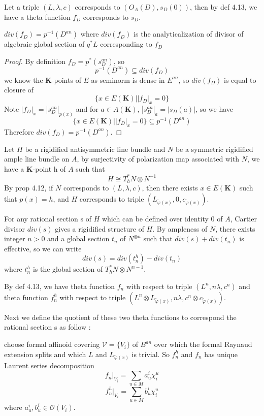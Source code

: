 \documentclass[10pt,a4paper]{amsart}
\theoremstyle{plain}
\theoremstyle{plain}
\numberwithin{equation}{section}
\begin{document}
Let a triple $(L,\lambda,c)$ corresponds to $(O_A(D),s_D(0))$, then by def 4.13, we have a theta function $f_D$ corresponds to $s_D$.
\begin{prop}
	$div(f_D)=p^{-1}(D^{an})$ where $div(f_D)$ is the analyticalization of divisor of algebraic global section of $q^*L$ corresponding to $f_D$
\end{prop}
\begin{proof}
	By definition $f_D=p^*(s_D^{an})$, so 
	$$p^{-1}(D^{an})\subseteq div(f_D)$$
	we know the $\mathbf{K}$-points of $E$ as seminorm is dense in $E^{an}$, so 
	$div(f_D)$ is equal to closure of 
	$$\{x\in E(\mathbf{K})||f_D|_x=0\}$$
	Note $|f_D|_x=|s_D^{an}|_{p(x)}$ and for $a\in A(\mathbf{K})$, 
	$|s_D^{an}|_a=|s_D(a)|$, so we have
	$$\{x\in E(\mathbf{K})||f_D|_x=0\}\subseteq p^{-1}(D^{an})$$
	Therefore $div(f_D)=p^{-1}(D^{an})$.
\end{proof}
Let $H$ be a rigidified antisymmetric line bundle and $N$ be a symmetric rigidified ample line bundle on $A$, by surjectivity of polarization map associated with $N$, we have a $\mathbf{K}$-point h of $A$ such that 
$$H\cong T^*_hN\otimes N^{-1}$$
By prop 4.12, if $N$ corresponds to $(L,\lambda,c)$, then there exists $x\in E(\mathbf{K})$ such that $p(x)=h$, and $H$ corresponds to triple $(L_{\widetilde{\varphi}(x)},0,c_{\widetilde{\varphi}(x)})$.


For any rational section s of $H$ which can be defined over identity 0 of $A$, Cartier divisor $div(s)$ gives a rigidified structure of $H$. By ampleness of $N$, there exists integer $n>0$ and a global section $t_n$ of $N^{\otimes n}$ such that 
$div(s)+div(t_n)$ is effective, so we can write 
$$div(s)=div(t_n^h)-div(t_n)$$
where $t_n^h$ is the global section of $T^*_hN\otimes N^{n-1}$.


By def 4.13, we have theta function $f_n$ with respect to triple $(L^n,n\lambda,c^n)$ and theta function $f_n^h$ with respect to triple $(L^n\otimes L_{\widetilde{\varphi}(x)} ,n\lambda,c^n\otimes c_{\widetilde{\varphi}(x)})$.


Next we define the quotient of these two theta functions to correspond the rational section s as follow : 


choose formal affinoid covering $\mathscr{V}=\{V_i\}$ of $B^{an}$ over which the formal Raynaud extension splits and which $L$ and $L_{\widetilde{\varphi}(x)}$ is trivial. So $f_n^h$ and $f_n$ has unique Laurent series decomposition
$$f_n|_{V_i}=\sum_{u\in M}a_u^i\chi^u_i$$
$$f_n^h|_{V_i}=\sum_{u\in M}b_u^i\chi^u_i$$
where $a_u^i,b_u^i\in \mathscr{O}(V_i)$.
\end{document}
